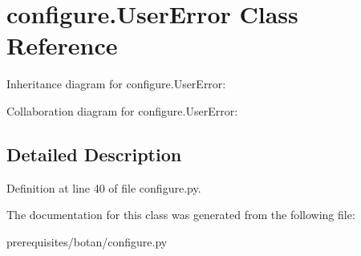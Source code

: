 \hypertarget{classconfigure_1_1_user_error}{}\section{configure.\+User\+Error Class Reference}
\label{classconfigure_1_1_user_error}


Inheritance diagram for configure.\+User\+Error\+:


Collaboration diagram for configure.\+User\+Error\+:


\subsection{Detailed Description}


Definition at line 40 of file configure.\+py.



The documentation for this class was generated from the following file\+:\begin{DoxyCompactItemize}
\item 
prerequisites/botan/configure.\+py\end{DoxyCompactItemize}
